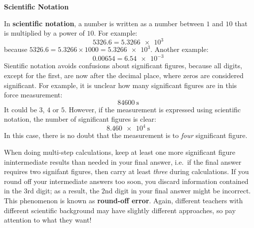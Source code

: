 \documentclass{../../oss-handout}
\begin{document}
\begin{center}
  \textbf{Scientific Notation}
\end{center}
In \textbf{scientific notation}, a number is written as a number between $1$
and $10$ that is multiplied by a power of $10$. For example:
\begin{equation*}
  5326.6 = \num{5.3266e3}
\end{equation*}
because $5326.6=5.3266\times 1000 = \num{5.3266e3}$. Another example:
\begin{equation*}
  0.00654=\num{6.54e-3}
\end{equation*}
Sientific notation avoids confusions about significant figures, because all
digits, except for the first, are now after the decimal place, where zeros are
considered significant. For example, it is unclear how many significant
figures are in this force measurement:
\begin{equation*}
  \SI{84600}{\second}
\end{equation*}
It could be $3$, $4$ or $5$. However, if the measurement is expressed using
scientific notation, the number of significant figures is clear:
\begin{equation*}
  \SI{8.460e4}{\second}
\end{equation*}
In this case, there is no doubt that the measurement is to \emph{four}
significant figure.

When doing multi-step calculations, keep at least one more significant figure
inintermediate results than needed in your final answer, i.e.\ if the final
answer requires two signifant figures, then carry at least \emph{three} during
calculations. If you round off your intermediate answers too soon, you discard
information contained in the $3$rd digit; as a result, the $2$nd digit in
your final answer might be incorrect. This phenomenon is known as
\textbf{round-off error}. Again, different teachers with different scientific
background may have slightly different approaches, so pay attention to what
they want!
\end{document}
